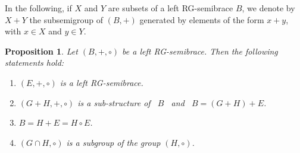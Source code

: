 \documentclass[11pt]{amsart}
\newtheorem{proposition}[theorem]{Proposition}
\theoremstyle{definition}
\begin{document}
\smallskip

In the following, if $X$ and $Y$ are subsets of a left RG-semibrace $B$, we denote by $X + Y$ the subsemigroup of $(B, +)$ generated by elements of the form $x+y$, with $x\in X$ and $y\in Y$. 
\begin{proposition}
Let $(B,+,\circ)$ be a left RG-semibrace. Then the following statements hold:
    \begin{enumerate}
        \item[{\rm(a)}] $(E,+,\circ)$ is a left RG-semibrace.
        \item[{\rm(b)}] %
        $(G + H, +, \circ)$ is  a sub-structure of \ $B$ \ and \ $B = (G + H) +  E$.
        \item[{\rm(c)}] $B = H + E= H\circ E$.
        \item[{\rm(d)}] $(G\cap H, \circ)$ is a subgroup of the group $(H,\circ)$.
    \end{enumerate}
\end{proposition}
\end{document}
